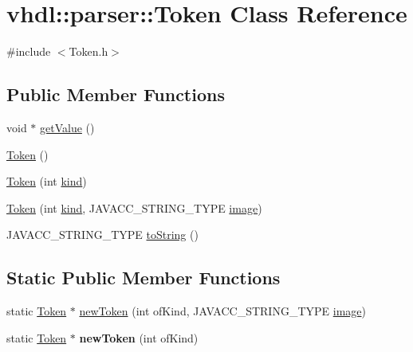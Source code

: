 \hypertarget{classvhdl_1_1parser_1_1_token}{}\section{vhdl\+::parser\+::Token Class Reference}
\label{classvhdl_1_1parser_1_1_token}


{\ttfamily \#include $<$Token.\+h$>$}

\subsection*{Public Member Functions}
\begin{DoxyCompactItemize}
\item 
void $\ast$ \mbox{\hyperlink{classvhdl_1_1parser_1_1_token_adf2e437f6aeef2e6d195ebfe51ae2bb0}{get\+Value}} ()
\item 
\mbox{\hyperlink{classvhdl_1_1parser_1_1_token_af4c8d87a0456cd4ce8a65662fa507bb1}{Token}} ()
\item 
\mbox{\hyperlink{classvhdl_1_1parser_1_1_token_a3111dc253c0e2eb0a0cf128914ec4a44}{Token}} (int \mbox{\hyperlink{classvhdl_1_1parser_1_1_token_a021bfae89b9eec39a87db9577508916c}{kind}})
\item 
\mbox{\hyperlink{classvhdl_1_1parser_1_1_token_a3a25de73b579708d1b82f2ad247816d8}{Token}} (int \mbox{\hyperlink{classvhdl_1_1parser_1_1_token_a021bfae89b9eec39a87db9577508916c}{kind}}, J\+A\+V\+A\+C\+C\+\_\+\+S\+T\+R\+I\+N\+G\+\_\+\+T\+Y\+PE \mbox{\hyperlink{classvhdl_1_1parser_1_1_token_abafca7a99f0aca2f76d1d9094bf22e9c}{image}})
\item 
J\+A\+V\+A\+C\+C\+\_\+\+S\+T\+R\+I\+N\+G\+\_\+\+T\+Y\+PE \mbox{\hyperlink{classvhdl_1_1parser_1_1_token_a1642fdaf589e2f0158e101d9a335d75a}{to\+String}} ()
\end{DoxyCompactItemize}
\subsection*{Static Public Member Functions}
\begin{DoxyCompactItemize}
\item 
static \mbox{\hyperlink{classvhdl_1_1parser_1_1_token}{Token}} $\ast$ \mbox{\hyperlink{classvhdl_1_1parser_1_1_token_af4f2850e46715e5ec1ddd430f9c5aaff}{new\+Token}} (int of\+Kind, J\+A\+V\+A\+C\+C\+\_\+\+S\+T\+R\+I\+N\+G\+\_\+\+T\+Y\+PE \mbox{\hyperlink{classvhdl_1_1parser_1_1_token_abafca7a99f0aca2f76d1d9094bf22e9c}{image}})
\item 
\mbox{\label{classvhdl_1_1parser_1_1_token_ad7dc0d02c87d8c1fc1a31f048b98f188}} 
static \mbox{\hyperlink{classvhdl_1_1parser_1_1_token}{Token}} $\ast$ {\bfseries new\+Token} (int of\+Kind)
\end{DoxyCompactItemize}
